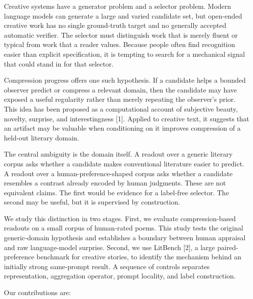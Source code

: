 \documentclass[
]{article}
\begin{document}
Creative systems have a generator problem and a selector problem. Modern
language models can generate a large and varied candidate set, but
open-ended creative work has no single ground-truth target and no
generally accepted automatic verifier. The selector must distinguish
work that is merely fluent or typical from work that a reader values.
Because people often find recognition easier than explicit
specification, it is tempting to search for a mechanical signal that
could stand in for that selector.

Compression progress offers one such hypothesis. If a candidate helps a
bounded observer predict or compress a relevant domain, then the
candidate may have exposed a useful regularity rather than merely
repeating the observer's prior. This idea has been proposed as a
computational account of subjective beauty, novelty, surprise, and
interestingness {[}1{]}. Applied to creative text, it suggests that an
artifact may be valuable when conditioning on it improves compression of
a held-out literary domain.

The central ambiguity is the domain itself. A readout over a generic
literary corpus asks whether a candidate makes conventional literature
easier to predict. A readout over a human-preference-shaped corpus asks
whether a candidate resembles a contrast already encoded by human
judgments. These are not equivalent claims. The first would be evidence
for a label-free selector. The second may be useful, but it is
supervised by construction.

We study this distinction in two stages. First, we evaluate
compression-based readouts on a small corpus of human-rated poems. This
study tests the original generic-domain hypothesis and establishes a
boundary between human appraisal and raw language-model surprise.
Second, we use LitBench {[}2{]}, a large paired-preference benchmark for
creative stories, to identify the mechanism behind an initially strong
same-prompt result. A sequence of controls separates representation,
aggregation operator, prompt locality, and label construction.

Our contributions are:
\end{document}
